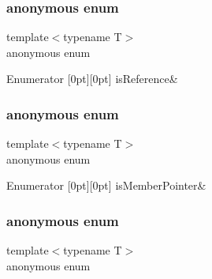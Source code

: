 \subsubsection{\texorpdfstring{anonymous enum}{anonymous enum}}
{\footnotesize\ttfamily template$<$typename T$>$ \\
anonymous enum}

\begin{DoxyEnumFields}{Enumerator}
[0pt][0pt]{}\mbox{\label{classUtil_1_1TypeTraits_ad8ec6b7fcee82a1169b89d2da8419edaac0cdaf0e77f765430820e96bb7cf4619}} 
is\+Reference&\\
\hline

\end{DoxyEnumFields}
\mbox{\label{classUtil_1_1TypeTraits_aee8735f108bb235c2d59b8b823e04086}} 
\subsubsection{\texorpdfstring{anonymous enum}{anonymous enum}}
{\footnotesize\ttfamily template$<$typename T$>$ \\
anonymous enum}

\begin{DoxyEnumFields}{Enumerator}
[0pt][0pt]{}\mbox{\label{classUtil_1_1TypeTraits_ad2b47cd121495f38449b1f8c10afb067abe04caa758890fee25930d96123265d2}} 
is\+Member\+Pointer&\\
\hline

\end{DoxyEnumFields}
\mbox{\label{classUtil_1_1TypeTraits_adeb31ff7f9c6d08ecab48c1ab4b5dc2c}} 
\subsubsection{\texorpdfstring{anonymous enum}{anonymous enum}}
{\footnotesize\ttfamily template$<$typename T$>$ \\
anonymous enum}

